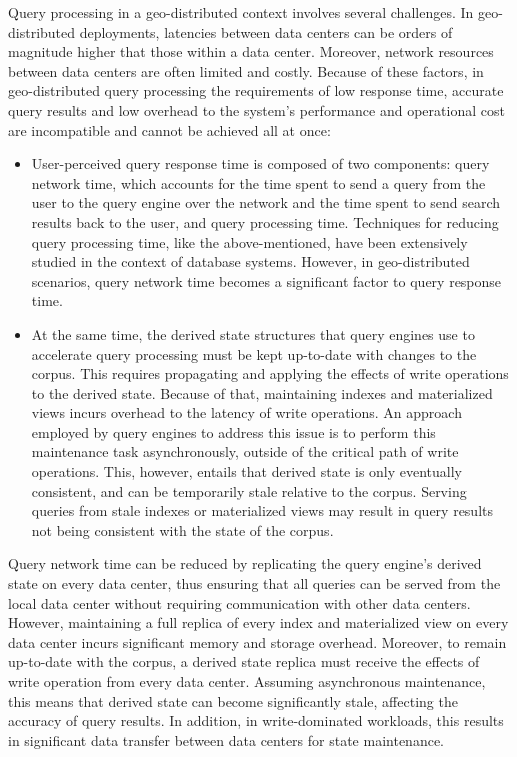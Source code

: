 Query processing in a geo-distributed context involves several challenges.
In geo-distributed deployments,
latencies between data centers can be orders of magnitude higher that those within a data center.
Moreover, network resources between data centers are often limited and costly.
Because of these factors,
in geo-distributed query processing
the requirements of low response time, accurate query results and low overhead to the system's performance and operational
cost are incompatible and cannot be achieved all at once:

\begin{itemize}
  \item User-perceived query response time is composed of two components:
  query network time, which accounts for the time spent to send a query from the user to the query engine over the network
  and the time spent to send search results back to the user, and query processing time.
  Techniques for reducing query processing time, like the above-mentioned, have been extensively studied in the context of database systems.
  However, in geo-distributed scenarios, query network time becomes a significant factor to query response time.

  \item At the same time, the derived state structures that query engines use to accelerate query processing must be kept up-to-date with changes to the corpus.
  This requires propagating and applying the effects of write operations to the derived state.
  Because of that, maintaining indexes and materialized views incurs overhead to the latency of write operations.
  An approach employed by query engines to address this issue is to perform this maintenance task asynchronously,
  outside of the critical path of write operations.
  This, however, entails that derived state is only eventually consistent, and can be temporarily stale relative to the corpus.
  Serving queries from stale indexes or materialized views may result in query results not being consistent with the state of the corpus.
\end{itemize}

Query network time can be reduced by replicating the query engine's derived state on every data center,
thus ensuring that all queries can be served from the local data center without requiring communication with other data centers.
However, maintaining a full replica of every index and materialized view on every data center incurs significant memory and storage overhead.
Moreover, to remain up-to-date with the corpus, a derived state replica must receive the effects of write operation from every data center.
Assuming asynchronous maintenance, this means that derived state can become significantly stale, affecting the accuracy of query results.
In addition, in write-dominated workloads, this results in significant data transfer between data centers for state maintenance.

